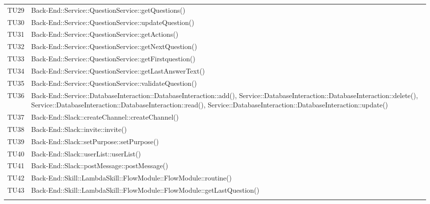 \documentclass[../PianoDiQualifica_v3.0.0.tex]{subfiles}
\begin{document}
\begin{longtable}[c] { >{\centering\arraybackslash}p{} >{\centering\arraybackslash}p{}}
			TU29 & Back-End::Service::QuestionService::getQuestions() \\
			\addlinespace[0.3em]
			\midrule
			\addlinespace[0.3em]
			TU30 & Back-End::Service::QuestionService::updateQuestion() \\
			\addlinespace[0.3em]
			\midrule
			\addlinespace[0.3em]
			TU31 & Back-End::Service::QuestionService::getActions() \\
			\addlinespace[0.3em]
			\midrule
			\addlinespace[0.3em]
			TU32 & Back-End::Service::QuestionService::getNextQuestion() \\
			\addlinespace[0.3em]
			\midrule
			\addlinespace[0.3em]
			TU33 & Back-End::Service::QuestionService::getFirstquestion() \\
			\addlinespace[0.3em]
			\midrule
			\addlinespace[0.3em]
			TU34 & Back-End::Service::QuestionService::getLastAnswerText() \\
			\addlinespace[0.3em]
			\midrule
			\addlinespace[0.3em]
			TU35 & Back-End::Service::QuestionService::validateQuestion() \\
			\addlinespace[0.3em]
			\midrule
			\addlinespace[0.3em]
			TU36 & Back-End::Service::DatabaseInteraction::DatabaseInteraction::add(), Service::DatabaseInteraction::DatabaseInteraction::delete(), Service::DatabaseInteraction::DatabaseInteraction::read(), Service::DatabaseInteraction::DatabaseInteraction::update() \\
			\addlinespace[0.3em]
			\midrule
			\addlinespace[0.3em]
			TU37 & Back-End::Slack::createChannel::createChannel() \\
			\addlinespace[0.3em]
			\midrule
			\addlinespace[0.3em]
			TU38 & Back-End::Slack::invite::invite() \\
			\addlinespace[0.3em]
			\midrule
			\addlinespace[0.3em]
			TU39 & Back-End::Slack::setPurpose::setPurpose() \\
			\addlinespace[0.3em]
			\midrule
			\addlinespace[0.3em]
			TU40 & Back-End::Slack::userList::userList() \\
			\addlinespace[0.3em]
			\midrule
			\addlinespace[0.3em]
			TU41 & Back-End::Slack::postMessage::postMessage() \\
			\addlinespace[0.3em]
			\midrule
			\addlinespace[0.3em]
			TU42 & Back-End::Skill::LambdaSkill::FlowModule::FlowModule::routine() \\
			\addlinespace[0.3em]
			\midrule
			\addlinespace[0.3em]
			TU43 & Back-End::Skill::LambdaSkill::FlowModule::FlowModule::getLastQuestion() \\
			\addlinespace[0.3em]

\end{longtable}
\end{document}
